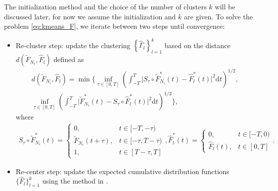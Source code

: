 		The initialization method and the choice of the number of clusters $k$ will be discussed later, for now we assume the initialization and $k$ are given.
		To solve the problem \eqref{eq:kmeans_F}, we iterate between two steps until convergence:
			\begin{itemize}
				\item Re-cluster step: update the clustering 
				$\left\{ \hat\Gamma_l \right\}_{l=1}^k$ based on the distance $d(\tilde{F}_{N_i}, \hat F_l)$ 
				defined as 
				\begin{align*}
				 d(\tilde{F}_{N_i}, \hat F_l) = \min\Big\{ \inf_{\tau\in[0,T]}\left( \int_{-T}^T\big| S_\tau\circ\tilde{F}^*_{N_i}(t)-\hat F_{l}^*(t) \big|^2 \text{d}t \right)^{1/2}, \\
				 \inf_{\tau\in[0,T]}\left( \int_{-T}^T\big| \tilde{F}^*_{N_i}(t)-S_\tau\circ\hat F_{l}^*(t) \big|^2 \text{d}t \right)^{1/2} \Big\},
				\end{align*}
				where
				\begin{align}\label{eq:def of shifted curve}
				S_\tau\circ\tilde{F}^*_{N_i}(t)=
				\begin{cases}
				0, &t\in[-T,-\tau)\\
				\tilde F_{N_i}(t+ \tau), &t\in[-\tau,T-\tau)\\
				1,& t\in [T-\tau,T]
				\end{cases},
				\hat F_{l}^*(t)=
				\begin{cases}
				0, &t\in[-T,0)\\
				\hat F_{l}(t), &t\in [0,T]
				\end{cases}.
				\end{align}
				
				
				\item Re-center step: update the expected cumulative distribution functions $\{\hat F_l\}_{l=1}^k$ using the method in \citet{Bigot2013}.

			\end{itemize}

